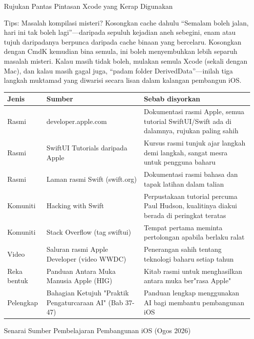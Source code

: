 \begin{center}\small\color{gray}Rujukan Pantas Pintasan Xcode yang Kerap Digunakan\end{center}

\begin{tcbinfo}{Tips: Masalah kompilasi misteri? Kosongkan cache dahulu}
“Semalam boleh jalan, hari ini tak boleh lagi”—daripada sepuluh kejadian aneh sebegini, enam atau tujuh daripadanya berpunca daripada cache binaan yang bercelaru. Kosongkan dengan CmdK kemudian bina semula, ini boleh menyembuhkan lebih separuh masalah misteri. Kalau masih tidak boleh, mulakan semula Xcode (sekali dengan Mac), dan kalau masih gagal juga, “padam folder DerivedData”—inilah tiga langkah muktamad yang diwarisi secara lisan dalam kalangan pembangun iOS.

\end{tcbinfo}



\begin{center}
\begin{tabularx}{\linewidth}{|X|X|X|}
\hline
\textbf{Jenis} & \textbf{Sumber} & \textbf{Sebab disyorkan} \tabularnewline
\hline
Rasmi & developer.apple.com & Dokumentasi rasmi Apple, semua tutorial SwiftUI/Swift ada di dalamnya, rujukan paling sahih \tabularnewline
Rasmi & SwiftUI Tutorials daripada Apple & Kursus rasmi tunjuk ajar langkah demi langkah, sangat mesra untuk pengguna baharu \tabularnewline
Rasmi & Laman rasmi Swift (swift.org) & Dokumentasi rasmi bahasa dan tapak latihan dalam talian \tabularnewline
Komuniti & Hacking with Swift & Perpustakaan tutorial percuma Paul Hudson, kualitinya diakui berada di peringkat teratas \tabularnewline
Komuniti & Stack Overflow (tag swiftui) & Tempat pertama meminta pertolongan apabila berlaku ralat \tabularnewline
Video & Saluran rasmi Apple Developer (video WWDC) & Penerangan sahih tentang teknologi baharu setiap tahun \tabularnewline
Reka bentuk & Panduan Antara Muka Manusia Apple (HIG) & Kitab rasmi untuk menghasilkan antara muka ber"rasa Apple" \tabularnewline
Pelengkap & Bahagian Ketujuh "Praktik Pengaturcaraan AI" (Bab 37-47) & Panduan lengkap menggunakan AI bagi membantu pembangunan iOS \tabularnewline
\hline
\end{tabularx}
\end{center}

\begin{center}\small\color{gray}Senarai Sumber Pembelajaran Pembangunan iOS (Ogos 2026)\end{center}

